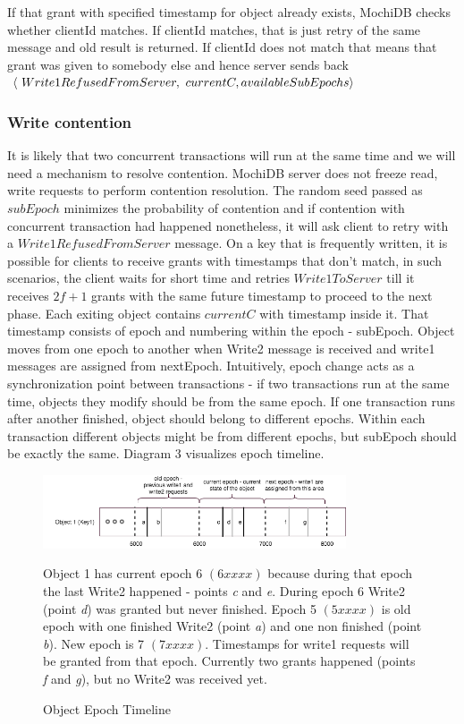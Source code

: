 \documentclass[letterpaper,twocolumn,10pt]{article}
\begin{document}
If that grant with specified timestamp for object already exists, MochiDB checks whether clientId matches. If clientId matches, that is just retry of the same message and old result is returned. If clientId does not match that means that grant was given to somebody else and hence server sends back
$\langle\ Write1RefusedFromServer,\ currentC,\\ availableSubEpochs\rangle$


\subsubsection{Write contention} \label{write_contension}
It is likely that two concurrent transactions will run at the same time and we will need a mechanism to resolve contention. MochiDB server does not freeze read, write requests to perform contention resolution. The random seed passed as $subEpoch$ minimizes the probability of contention and if contention with concurrent transaction had happened nonetheless, it will ask client to retry with a $Write1RefusedFromServer$ message. On a key that is frequently written, it is possible for clients to receive grants with timestamps that don't match, in such scenarios, the client waits for short time and retries $Write1ToServer$ till it receives $2f+1$ grants with the same future timestamp to proceed to the next phase.
Each exiting object contains $currentC$ with timestamp inside it. That timestamp consists of epoch and numbering within the epoch - subEpoch. Object moves from one epoch to another when Write2 message is received and write1 messages are assigned from nextEpoch. Intuitively, epoch change acts as a synchronization point between transactions - if two transactions run at the same time, objects they modify should be from the same epoch. If one transaction runs after another finished, object should belong to different epochs. Within each transaction different objects might be from different epochs, but subEpoch should be exactly the same. Diagram 3 visualizes epoch timeline. 

\begin{figure}
\includegraphics[width=0.8\textwidth]{Epochs.png}
\label{fig:epochs_view}
\caption{Object Epoch Timeline}
\small Object 1 has current epoch 6 $\left(6xxxx\right)$ because during that epoch the last Write2 happened - points \textit{c} and \textit{e}. During epoch 6 Write2 (point \textit{d}) was granted but never finished. Epoch 5 $\left(5xxxx\right)$ is old epoch with one finished Write2 (point \textit{a}) and one non finished (point \textit{b}). New epoch is 7 $\left(7xxxx\right)$. Timestamps for write1 requests will be granted from that epoch. Currently two grants happened (points \textit{f} and \textit{g}), but no Write2 was received yet.
\centering
\end{figure}
\end{document}
